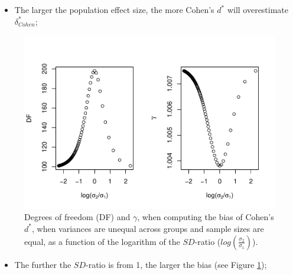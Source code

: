 \documentclass[
  english,
  man,mask]{apa6}
\providecommand{\tightlist}{%
  \setlength{\itemsep}{0pt}\setlength{\parskip}{0pt}}
\begin{document}
\begin{itemize}
\tightlist
\item
  The larger the population effect size, the more Cohen's \(d^*\) will overestimate \(\delta^*_{Cohen}\);
\end{itemize}

\begin{figure}
\centering
\includegraphics{SupMat1_files/figure-latex/biascohendprimehetbalSDratio2-1.pdf}
\caption{\label{fig:biascohendprimehetbalSDratio2}Degrees of freedom (DF) and \(\gamma\), when computing the bias of Cohen's \(d^*\), when variances are unequal across groups and sample sizes are equal, as a function of the logarithm of the \(SD\)-ratio (\(log \left( \frac{\sigma_2}{\sigma_1} \right)\)).}
\end{figure}

\begin{itemize}
\tightlist
\item
  The further the \(SD\)-ratio is from 1, the larger the bias (see Figure \ref{fig:biascohendprimehetbalSDratio2});
\end{itemize}
\end{document}
